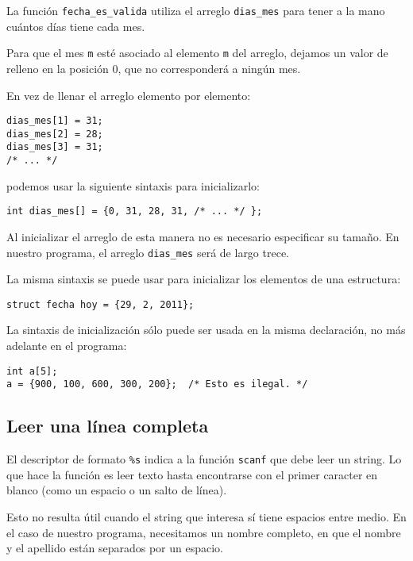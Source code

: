 La función \lstinline!fecha_es_valida! utiliza el arreglo
\lstinline!dias_mes! para tener a la mano cuántos días tiene cada mes.

Para que el mes \lstinline!m! esté asociado al elemento \lstinline!m!
del arreglo, dejamos un valor de relleno en la posición 0, que no
corresponderá a ningún mes.

En vez de llenar el arreglo elemento por elemento:

\begin{lstlisting}
dias_mes[1] = 31;
dias_mes[2] = 28;
dias_mes[3] = 31;
/* ... */
\end{lstlisting}

podemos usar la siguiente sintaxis para inicializarlo:

\begin{lstlisting}
int dias_mes[] = {0, 31, 28, 31, /* ... */ };
\end{lstlisting}

Al inicializar el arreglo de esta manera no es necesario especificar su
tamaño. En nuestro programa, el arreglo \lstinline!dias_mes! será de
largo trece.

La misma sintaxis se puede usar para inicializar los elementos de una
estructura:

\begin{lstlisting}
struct fecha hoy = {29, 2, 2011};
\end{lstlisting}

La sintaxis de inicialización sólo puede ser usada en la misma
declaración, no más adelante en el programa:

\begin{lstlisting}
int a[5];
a = {900, 100, 600, 300, 200};  /* Esto es ilegal. */
\end{lstlisting}

\subsection{Leer una línea completa}

El descriptor de formato \lstinline!%s! indica a la función
\lstinline!scanf! que debe leer un string. Lo que hace la función es
leer texto hasta encontrarse con el primer caracter en blanco (como un
espacio o un salto de línea).

Esto no resulta útil cuando el string que interesa sí tiene espacios
entre medio. En el caso de nuestro programa, necesitamos un nombre
completo, en que el nombre y el apellido están separados por un espacio.

